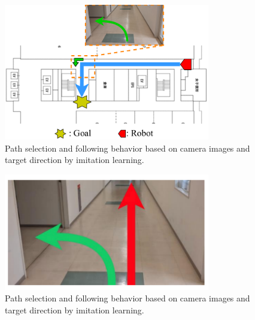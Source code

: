 \begin{figure}[htbp]
     \centering
      \includegraphics[width=90mm]{images/pdf/nav_need.pdf}
      \caption{Path selection and following behavior based 
      on camera images and target direction by imitation learning.}\label{fig:nav_need}
 \end{figure}
 \begin{figure}[htbp]
     \centering
      \includegraphics[width=90mm]{images/pdf/branch_path.pdf}
      \caption{Path selection and following behavior based 
      on camera images and target direction by imitation learning.}\label{fig:haru_select}
 \end{figure}
\newpage
